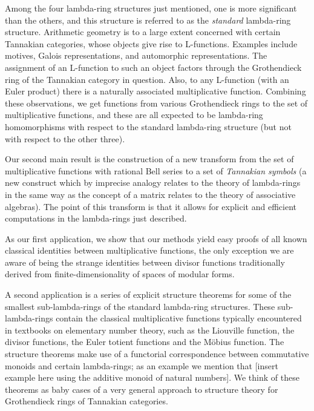 \documentclass[a4paper]{article}
\begin{document}
Among the four lambda-ring structures just mentioned, one is more significant than the others, and this structure is referred to as the \emph{standard} lambda-ring structure. Arithmetic geometry is to a large extent concerned with certain Tannakian categories, whose objects give rise to L-functions. Examples include motives, Galois representations, and automorphic representations. The assignment of an L-function to such an object factors through the Grothendieck ring of the Tannakian category in question. Also, to any L-function (with an Euler product) there is a naturally associated multiplicative function. Combining these observations, we get functions from various Grothendieck rings to the set of multiplicative functions, and these are all expected to be lambda-ring homomorphisms with respect to the standard lambda-ring structure (but not with respect to the other three). 

Our second main result is the construction of a new transform from the set of multiplicative functions with rational Bell series to a set of \emph{Tannakian symbols} (a new construct which by imprecise analogy relates to the theory of lambda-rings in the same way as the concept of a matrix relates to the theory of associative algebras). The point of this transform is that it allows for explicit and efficient computations in the lambda-rings just described.

As our first application, we show that our methods yield easy proofs of all known classical identities between multiplicative functions, the only exception we are aware of being the strange identities between divisor functions traditionally derived from finite-dimensionality of spaces of modular forms. %

A second application is a series of explicit structure theorems for some of the smallest sub-lambda-rings of the standard lambda-ring structures. These sub-lambda-rings contain the classical multiplicative functions typically encountered in textbooks on elementary number theory, such as the Liouville function, the divisor functions, the Euler totient functions and the M\"obius function. The structure theorems make use of a functorial correspondence between commutative monoids and certain lambda-rings; as an example we mention that [insert example here using the additive monoid of natural numbers]. We think of these theorems as baby cases of a very general approach to structure theory for Grothendieck rings of Tannakian categories.
\end{document}

